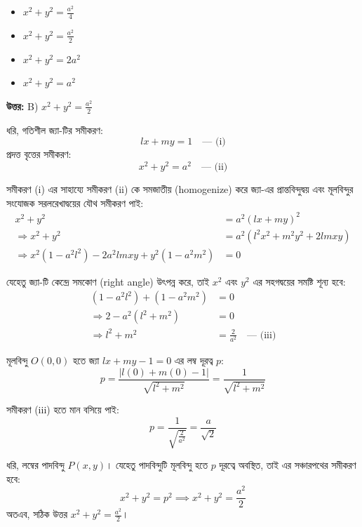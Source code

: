 \documentclass[12pt, a4paper]{article}
\begin{document}
\vspace{1em}
\begin{itemize}[label={}, leftmargin=1cm, itemsep=0.5em]
    \item[\textbf{A)}] $x^2 + y^2 = \frac{a^2}{4}$
    \item[\textbf{B)}] $x^2 + y^2 = \frac{a^2}{2}$
    \item[\textbf{C)}] $x^2 + y^2 = 2a^2$
    \item[\textbf{D)}] $x^2 + y^2 = a^2$
\end{itemize}

\vspace{0.5em}
\begin{tcolorbox}[answerbox]
    \textbf{\color{success} উত্তর:} B) $x^2 + y^2 = \frac{a^2}{2}$
\end{tcolorbox}
\vspace{1em}

\begin{tcolorbox}[solutionbox={সমাধান (Solution)}]
    \noindent
    ধরি, গতিশীল জ্যা-টির সমীকরণ: 
    \[ lx + my = 1 \quad \text{--- (i)} \]
    প্রদত্ত বৃত্তের সমীকরণ: 
    \[ x^2 + y^2 = a^2 \quad \text{--- (ii)} \]
    
    সমীকরণ (i) এর সাহায্যে সমীকরণ (ii) কে সমজাতীয় (homogenize) করে জ্যা-এর প্রান্তবিন্দুদ্বয় এবং মূলবিন্দুর সংযোজক সরলরেখাদ্বয়ের যৌথ সমীকরণ পাই:
    \begin{align*}
        x^2 + y^2 &= a^2(lx + my)^2 \\
        \Rightarrow x^2 + y^2 &= a^2(l^2x^2 + m^2y^2 + 2lmxy) \\
        \Rightarrow x^2(1 - a^2l^2) - 2a^2lmxy + y^2(1 - a^2m^2) &= 0
    \end{align*}
    
    যেহেতু জ্যা-টি কেন্দ্রে সমকোণ (right angle) উৎপন্ন করে, তাই $x^2$ এবং $y^2$ এর সহগদ্বয়ের সমষ্টি শূন্য হবে:
    \begin{align*}
        (1 - a^2l^2) + (1 - a^2m^2) &= 0 \\
        \Rightarrow 2 - a^2(l^2 + m^2) &= 0 \\
        \Rightarrow l^2 + m^2 &= \frac{2}{a^2} \quad \text{--- (iii)}
    \end{align*}
    
    মূলবিন্দু $O(0, 0)$ হতে জ্যা $lx + my - 1 = 0$ এর লম্ব দূরত্ব $p$:
    \[ p = \frac{|l(0) + m(0) - 1|}{\sqrt{l^2 + m^2}} = \frac{1}{\sqrt{l^2 + m^2}} \]
    
    সমীকরণ (iii) হতে মান বসিয়ে পাই:
    \[ p = \frac{1}{\sqrt{\frac{2}{a^2}}} = \frac{a}{\sqrt{2}} \]
    
    ধরি, লম্বের পাদবিন্দু $P(x, y)$। যেহেতু পাদবিন্দুটি মূলবিন্দু হতে $p$ দূরত্বে অবস্থিত, তাই এর সঞ্চারপথের সমীকরণ হবে:
    \[ x^2 + y^2 = p^2 \implies x^2 + y^2 = \frac{a^2}{2} \]
    অতএব, সঠিক উত্তর \textbf{$x^2 + y^2 = \frac{a^2}{2}$}।
\end{tcolorbox}
\end{document}
